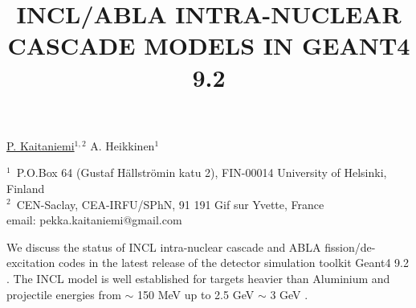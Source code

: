 \documentclass[12pt]{article}
\begin{document}
\title{INCL/ABLA INTRA-NUCLEAR CASCADE MODELS IN GEANT4 9.2}


\underline{P. Kaitaniemi}$^{1, 2}$ A. Heikkinen$^1$ 

$^1$~P.O.Box 64 (Gustaf H\"allstr\"omin katu 2), FIN-00014 University of Helsinki, Finland\\
$^2$~CEN-Saclay, CEA-IRFU/SPhN, 91 191 Gif sur Yvette, France\\
email: pekka.kaitaniemi@gmail.com



We discuss the status of INCL intra-nuclear cascade and ABLA fission/de-excitation codes
in the latest release of the detector simulation toolkit Geant4 9.2 \cite{pk09aCollaboration, pk08aProceedings}.
The INCL model is well established for targets heavier than Aluminium
and projectile energies from $\sim$ 150 MeV up to 2.5 GeV $\sim$ 3 GeV \cite{pk08bProceedings}. 

\end{document}
